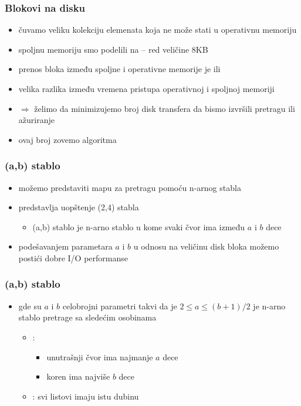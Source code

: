\documentclass[compress,aspectratio=169]{beamer}
\begin{document}
\begin{frame}[fragile]
  \frametitle{Blokovi na disku}
  \begin{itemize}
    \item čuvamo veliku kolekciju elemenata koja ne može stati u 
    operativnu memoriju
    \item spoljnu memoriju smo podelili na  -- red 
      veličine 8KB
    \item prenos bloka između spoljne i operativne memorije je 
     ili 
    \item velika razlika između vremena pristupa operativnoj i spoljnoj 
    memoriji
    \item $\Rightarrow$ želimo da minimizujemo broj disk transfera da
    bismo izvršili pretragu ili ažuriranje
    \item ovaj broj zovemo  algoritma
  \end{itemize}
\end{frame}

\begin{frame}[fragile]
  \frametitle{(a,b) stablo}
  \begin{itemize}
    \item možemo predstaviti mapu za pretragu pomoću n-arnog stabla
    \item {} predstavlja uopštenje (2,4) stabla
    \begin{itemize}
      \item (a,b) stablo je n-arno stablo u kome svaki čvor ima između
      $a$ i $b$ dece
    \end{itemize}
    \item podešavanjem parametara $a$ i $b$ u odnosu na veličinu disk 
    bloka možemo postići dobre I/O performanse
  \end{itemize}
\end{frame}

\begin{frame}[fragile]
  \frametitle{(a,b) stablo}
  \begin{itemize}
    \item {} gde su $a$ i $b$ celobrojni parametri 
    takvi da je $2\leq a\leq (b+1)/2$ je n-arno stablo pretrage sa
    sledećim osobinama
    \begin{itemize}
      \item {}:
      \begin{itemize}
        \item unutrašnji čvor ima najmanje $a$ dece
        \item koren ima najviše $b$ dece 
      \end{itemize}
      \item {}: svi listovi imaju istu dubinu
    \end{itemize}
  \end{itemize}
\end{frame}
\end{document}
